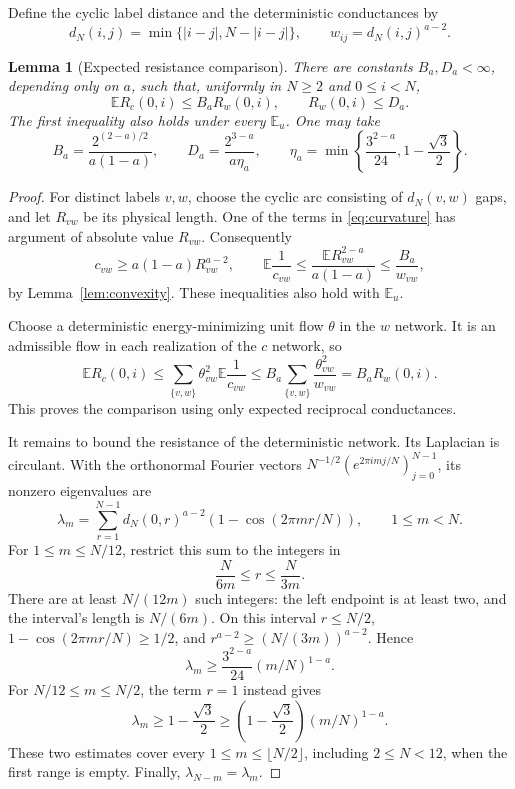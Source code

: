 \documentclass[11pt]{article}
\newtheorem{lemma}[theorem]{Lemma}
\theoremstyle{remark}\newtheorem{remark}[theorem]{Remark}
\newcommand{\E}{\mathbb E}
\begin{document}
Define the cyclic label distance and the deterministic conductances
by
\[
 d_N(i,j)=\min\{|i-j|,N-|i-j|\},\qquad
 w_{ij}=d_N(i,j)^{a-2}.
\]
\begin{lemma}[Expected resistance comparison]\label{lem:network}
There are constants $B_a,D_a<\infty$, depending only on $a$, such
that, uniformly in $N\ge2$ and $0\le i<N$,
\begin{equation}\label{eq:resistance-bound}
 \E R_c(0,i)\le B_aR_w(0,i),\qquad R_w(0,i)\le D_a.
\end{equation}
The first inequality also holds under every $\E_u$.  One may take
\[
 B_a=\frac{2^{(2-a)/2}}{a(1-a)},\qquad
 D_a=\frac{2^{3-a}}{a\eta_a},\qquad
 \eta_a=\min\left\{\frac{3^{2-a}}{24},1-\frac{\sqrt3}{2}\right\}.
\]
\end{lemma}
\begin{proof}
For distinct labels $v,w$, choose the cyclic arc consisting of
$d_N(v,w)$ gaps, and let $R_{vw}$ be its physical length.
One of the terms in \eqref{eq:curvature} has argument of absolute
value $R_{vw}$.  Consequently
\[
 c_{vw}\ge a(1-a)R_{vw}^{a-2},\qquad
 \E\frac1{c_{vw}}
       \le\frac{\E R_{vw}^{2-a}}{a(1-a)}
       \le\frac{B_a}{w_{vw}},
\]
by Lemma~\ref{lem:convexity}.  These inequalities also hold with
$\E_u$.

Choose a deterministic energy-minimizing unit flow $\theta$ in the
$w$ network.  It is an admissible flow in each realization of the
$c$ network, so
\[
 \E R_c(0,i)
  \le\sum_{\{v,w\}}\theta_{vw}^2\E\frac1{c_{vw}}
  \le B_a\sum_{\{v,w\}}\frac{\theta_{vw}^2}{w_{vw}}
  =B_aR_w(0,i).
\]
This proves the comparison using only expected reciprocal
conductances.

It remains to bound the resistance of the deterministic network.
Its Laplacian is circulant.  With the orthonormal Fourier vectors
$N^{-1/2}(e^{2\pi imj/N})_{j=0}^{N-1}$, its nonzero eigenvalues are
\begin{equation}\label{eq:cycle-eigenvalues}
 \lambda_m=\sum_{r=1}^{N-1}d_N(0,r)^{a-2}
                         (1-\cos(2\pi mr/N)),
                         \qquad 1\le m<N.
\end{equation}
For $1\le m\le N/12$, restrict this sum to the integers in
\[
 \frac{N}{6m}\le r\le\frac{N}{3m}.
\]
There are at least $N/(12m)$ such integers: the left endpoint is
at least two, and the interval's length is $N/(6m)$.
On this interval $r\le N/2$,
$1-\cos(2\pi mr/N)\ge1/2$, and
$r^{a-2}\ge(N/(3m))^{a-2}$.  Hence
\[
 \lambda_m\ge\frac{3^{2-a}}{24}(m/N)^{1-a}.
\]
For $N/12\le m\le N/2$, the term $r=1$ instead gives
\[
 \lambda_m\ge1-\frac{\sqrt3}{2}
          \ge\left(1-\frac{\sqrt3}{2}\right)(m/N)^{1-a}.
\]
These two estimates cover every $1\le m\le\lfloor N/2\rfloor$,
including $2\le N<12$, when the first range is empty.
Finally, $\lambda_{N-m}=\lambda_m$.


\end{proof}
\end{document}

